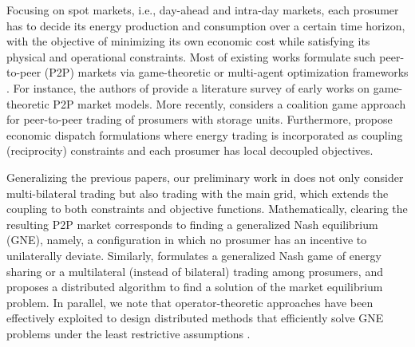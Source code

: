 \documentclass{IEEEtran}  %
\newcommand{\0}{\mathbf{0}}
\newcommand{\1}{\mathbf{1}}
\begin{document}
Focusing on spot markets, i.e., day-ahead and intra-day markets, each prosumer has to decide its energy production and consumption over a certain time horizon, with the objective of minimizing its own economic cost while satisfying its physical and operational constraints. 
Most of existing works formulate such peer-to-peer (P2P) markets via game-theoretic or multi-agent optimization frameworks \cite{tushar2018,tushar2020,lecadre2020,cui2020,zhang2020,baroche2019,sorin2019}. For instance, the authors of \cite{tushar2018} provide a literature survey of early works on game-theoretic P2P market models. {More recently, \cite{tushar2020} considers a coalition game approach for peer-to-peer trading of prosumers with storage units.}  Furthermore, \cite{lecadre2020,cui2020,zhang2020,baroche2019,sorin2019} propose economic dispatch formulations where energy trading is incorporated as coupling (reciprocity) constraints and each prosumer has local decoupled objectives. 

Generalizing the previous papers, our preliminary work in  \cite{belgioioso2020energy} does not only consider multi-bilateral trading  but also trading with the main grid, which extends the coupling to both constraints and objective functions. 
%
Mathematically, clearing the resulting P2P market corresponds to finding a generalized Nash equilibrium (GNE), namely, a configuration in which no prosumer has an incentive to unilaterally deviate. 
%
Similarly, \cite{wang2021} formulates a generalized Nash game of energy sharing or a multilateral (instead of bilateral) trading among prosumers, and proposes a distributed algorithm to find a solution of the market equilibrium problem. 
%
In parallel, we note that operator-theoretic approaches have been effectively exploited to design distributed methods that efficiently solve GNE problems under the least restrictive assumptions \cite{paccagnan2019,belgioioso2020b,gadjov2020single,belgioioso2020semi,
	bianchi2020fast}.
\end{document}
